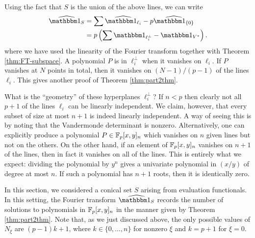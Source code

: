 Using the fact that $S$ is the union of the above lines, we can write
\begin{align*}
	\widehat{\IND_S} &= \sum \widehat{\IND_{\ell_i}} - p\widehat{\IND_{\{0\}}} \\
	&= p\left(\sum \IND_{\ell_i^\bot} - \IND_{V^*}\right).
\end{align*}
where we have used the linearity of the Fourier transform together with Theorem \ref{thm:FT-subspace}. A polynomial $P$ is in $\ell_i^\bot$ when it vanishes on $\ell_i$. If $P$ vanishes at $N$ points in total, then it vanishes on $(N - 1)/(p-1)$ of the lines $\ell_i$. This gives another proof of Theorem \ref{thm:part2thm}.

What is the ``geometry'' of these hyperplanes $\ell_i^\bot$? If $n < p$ then clearly not all $p+1$ of the lines $\ell_i$ can be linearly independent. We claim, however, that every subset of size at most $n+1$ is indeed linearly independent. A way of seeing this is by noting that the Vandermonde determinant is nonzero. Alternatively, one can explicitly produce a polynomial $P \in \mathbb{F}_p[x,y]_n$ which vanishes on $n$ given lines but not on the others. On the other hand, if an element of $\mathbb{F}_p[x,y]_n$ vanishes on $n+1$ of the lines, then in fact it vanishes on all of the lines. This is entirely what we expect: dividing the polynomial by $y^n$ gives a univariate polynomial in $(x/y)$ of degree at most $n$. If such a polynomial has $n+1$ roots, then it is identically zero.

In this section, we considered a conical set $S$ arising from evaluation functionals. In this setting, the Fourier transform $\widehat{\IND_S}$ records the number of solutions to polynomials in $\mathbb{F}_p[x,y]_n$ in the manner given by Theorem \ref{thm:part2thm}. Note that, as we just discussed above, the only possible values of $N_\xi$ are $(p-1)k + 1$, where $k\in\{0,\ldots,n\}$ for nonzero $\xi$ and $k=p+1$ for $\xi = 0$.